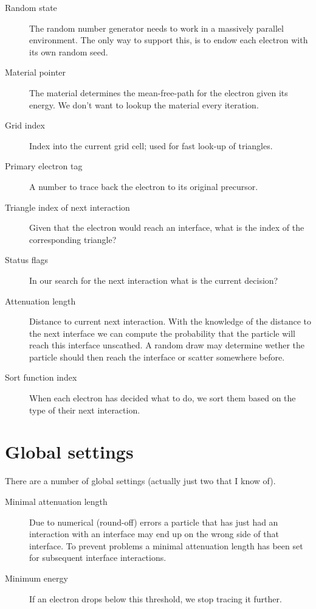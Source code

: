 \documentclass{article}
\theoremstyle{definition}
\begin{document}
\begin{description}
    \item[Random state] The random number generator needs to work in a massively parallel environment. The only way to support this, is to endow each electron with its own random seed.
    \item[Material pointer] The material determines the mean-free-path for the electron given its energy. We don't want to lookup the material every iteration.
    \item[Grid index] Index into the current grid cell; used for fast look-up of triangles.
    \item[Primary electron tag] A number to trace back the electron to its original precursor.
    \item[Triangle index of next interaction] Given that the electron would reach an interface, what is the index of the corresponding triangle?
    \item[Status flags] In our search for the next interaction what is the current decision?
    \item[Attenuation length] Distance to current next interaction. With the knowledge of the distance to the next interface we can compute the probability that the particle will reach this interface unscathed. A random draw may determine wether the particle should then reach the interface or scatter somewhere before.
    \item[Sort function index] When each electron has decided what to do, we sort them based on the type of their next interaction.
\end{description}
    
\section{Global settings}
There are a number of global settings (actually just two that I know of).

\begin{description}
    \item[Minimal attenuation length] Due to numerical (round-off) errors a particle that has just had an interaction with an interface may end up on the wrong side of that interface. To prevent problems a minimal attenuation length has been set for subsequent interface interactions.
    \item[Minimum energy] If an electron drops below this threshold, we stop tracing it further.
\end{description}
\end{document}
